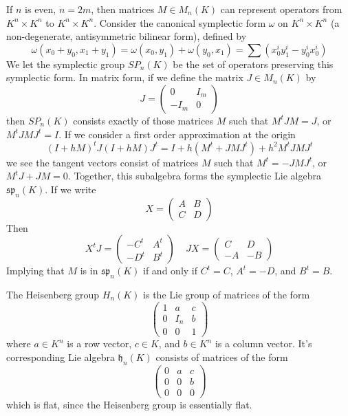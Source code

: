 \begin{example}
    If $n$ is even, $n = 2m$, then matrices $M \in M_n(K)$ can represent operators from $K^n \times K^n$ to $K^n \times K^n$. Consider the canonical symplectic form $\omega$ on $K^n \times K^n$ (a non-degenerate, antisymmetric bilinear form), defined by
    \[ \omega(x_0 + y_0, x_1 + y_1) = \omega(x_0,y_1) + \omega(y_0,x_1) = \sum (x_0^i y_1^i - y_0^i x_0^i) \]
    We let the symplectic group $SP_n(K)$ be the set of operators preserving this symplectic form. In matrix form, if we define the matrix $J \in M_n(K)$ by
    \[ J = \begin{pmatrix} 0 & I_m \\ -I_m & 0 \end{pmatrix} \]
    then $SP_n(K)$ consists exactly of those matrices $M$ such that $M^tJM = J$, or $M^tJMJ^t = I$. If we consider a first order approximation at the origin
    \[ (I + hM)^tJ(I + hM)J^t = I + h(M^t + JMJ^t) + h^2M^tJMJ^t \]
    we see the tangent vectors consist of matrices $M$ such that $M^t = -JMJ^t$, or $M^tJ + JM = 0$. Together, this subalgebra forms the symplectic Lie algebra $\mathfrak{sp}_n(K)$. If we write
    \[ X = \begin{pmatrix} A & B \\ C & D \end{pmatrix} \]
    Then
    \[ X^tJ = \begin{pmatrix} -C^t & A^t \\ -D^t & B^t \end{pmatrix}\ \ \ \ \ JX = \begin{pmatrix} C & D \\ -A & -B \end{pmatrix} \]
    Implying that $M$ is in $\mathfrak{sp}_n(K)$ if and only if $C^t = C$, $A^t= -D$, and $B^t = B$.
\end{example}

\begin{example}
    The Heisenberg group $H_n(K)$ is the Lie group of matrices of the form
    \[ \begin{pmatrix} 1 & a & c \\ 0 & I_n & b \\ 0 & 0 & 1 \end{pmatrix} \]
    where $a \in K^n$ is a row vector, $c \in K$, and $b \in K^n$ is a column vector. It's corresponding Lie algebra $\mathfrak{h}_n(K)$ consists of matrices of the form
    \[ \begin{pmatrix} 0 & a & c \\ 0 & 0 & b \\ 0 & 0 & 0 \end{pmatrix} \]
    which is flat, since the Heisenberg group is essentially flat.
\end{example}

